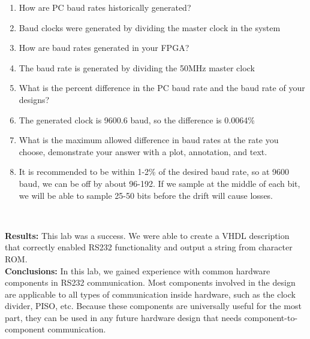 \documentclass{article}
\newcommand{\Q}{\textbf{Q:}}
\newcommand{\A}{\textbf{A:}}
\newcommand{\sect}[1]{\noindent\textbf{#1}}
\begin{document}
\begin{enumerate}
	\item[\Q] How are PC baud rates historically generated?
	\item[\A] Baud clocks were generated by dividing the master clock in the system
	\item[\Q] How are baud rates generated in your FPGA?
	\item[\A] The baud rate is generated by dividing the 50MHz master clock
	\item[\Q] What is the percent difference in the PC baud rate and the baud rate of your designs?
	\item[\A] The generated clock is 9600.6 baud, so the difference is 0.0064\%
	\item[\Q] What is the maximum allowed difference in baud rates at the rate you choose, demonstrate your answer with a plot, annotation, and text.
	\item[\A] It is recommended to be within 1-2\% of the desired baud rate, so at 9600 baud, we can be off by about 96-192. If we sample at the middle of each bit, we will be able to sample 25-50 bits before the drift will cause losses. 
\end{enumerate}~

\sect{Results:} This lab was a success. We were able to create a VHDL description that correctly enabled RS232 functionality and output a string from character ROM.\\

\sect{Conclusions:} In this lab, we gained experience with common hardware components in RS232 communication. Most components involved in the design are applicable to all types of communication inside hardware, such as the clock divider, PISO, etc. Because these components are universally useful for the most part, they can be used in any future hardware design that needs component-to-component communication.
\end{document}
